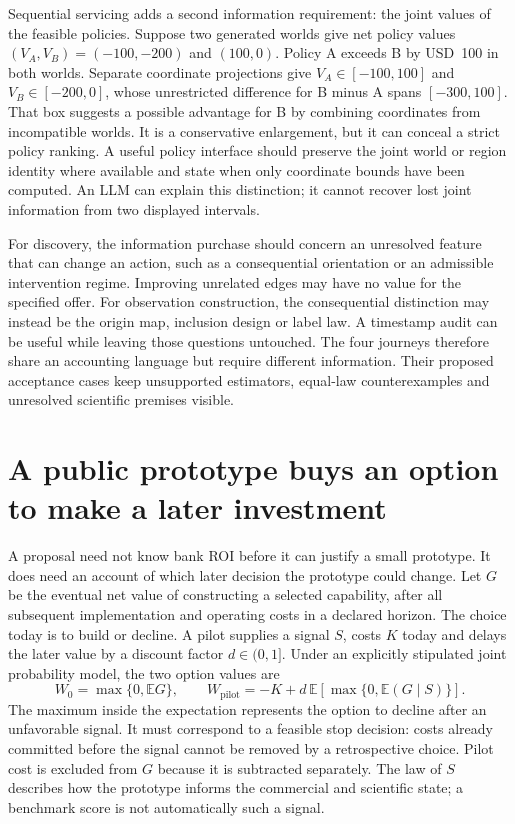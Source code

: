 Sequential servicing adds a second information requirement: the joint values
of the feasible policies. Suppose two generated worlds give net policy values
$(V_A,V_B)=(-100,-200)$ and $(100,0)$. Policy A exceeds B by USD~100 in both
worlds. Separate coordinate projections give $V_A\in[-100,100]$ and
$V_B\in[-200,0]$, whose unrestricted difference for B minus A spans $[-300,100]$. That
box suggests a possible advantage for B by combining coordinates from
incompatible worlds. It is a conservative enlargement, but it can conceal a
strict policy ranking. A useful policy interface should preserve the joint
world or region identity where available and state when only coordinate
bounds have been computed. An LLM can explain this distinction; it cannot
recover lost joint information from two displayed intervals.
\citep{exec14_l8_economics}

For discovery, the information purchase should concern an unresolved feature
that can change an action, such as a consequential orientation or an admissible
intervention regime. Improving unrelated edges may have no value for the
specified offer. For observation construction, the consequential distinction
may instead be the origin map, inclusion design or label law. A timestamp
audit can be useful while leaving those questions untouched. The four journeys
therefore share an accounting language but require different information.
Their proposed acceptance cases keep unsupported estimators, equal-law
counterexamples and unresolved scientific premises visible.
\citep{exec14_l8_design}

\section{A public prototype buys an option to make a later investment}
\label{exec14:l8-option}

A proposal need not know bank ROI before it can justify a small prototype.
It does need an account of which later decision the prototype could change.
Let $G$ be the eventual net value of constructing a selected capability, after
all subsequent implementation and operating costs in a declared horizon.
The choice today is to build or decline. A pilot supplies a signal $S$, costs
$K$ today and delays the later value by a discount factor $d\in(0,1]$.
Under an explicitly stipulated joint probability model, the two option values
are
\[
 W_0=\max\{0,\mathbb E G\},\qquad
 W_{\mathrm{pilot}}=-K+d\,\mathbb E[\max\{0,\mathbb E(G\mid S)\}].
\]
The maximum inside the expectation represents the option to decline after
an unfavorable signal. It must correspond to a feasible stop decision: costs
already committed before the signal cannot be removed by a retrospective
choice. Pilot cost is excluded from $G$ because it is subtracted separately.
The law of $S$ describes how the prototype informs the commercial and scientific
state; a benchmark score is not automatically such a signal.
\citep{exec14_l8_economics}


